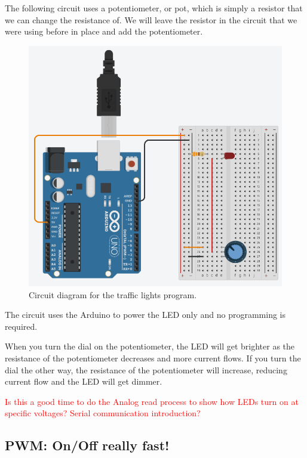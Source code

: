 \documentclass[12pt]{article}
\begin{document}
	The following circuit uses a potentiometer, or pot, which is simply a resistor that we can change the resistance of. We will leave the resistor in the circuit that we were using before in place and add the potentiometer.
	
	\begin{figure}[H]
	\begin{center}
		\includegraphics[scale=0.5]{LED_brightness_pot}
		\caption{Circuit diagram for the traffic lights program.}
		\label{fig:circuit_pot_brightness_ctrl}
	\end{center}
	\end{figure}

	The circuit uses the Arduino to power the LED only and no programming is required.
	
	When you turn the dial on the potentiometer, the LED will get brighter as the resistance of the potentiometer decreases and more current flows. If you turn the dial the other way, the resistance of the potentiometer will increase, reducing current flow and the LED will get dimmer.
	
	
	\textcolor{red}{Is this a good time to do the Analog read process to show how LEDs turn on at specific voltages? Serial communication introduction?}
	
	
	
	\subsection{PWM: On/Off really fast!}
	
\end{document}

